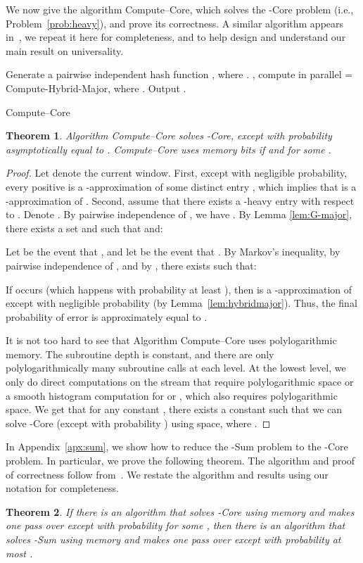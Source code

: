 \documentclass[11pt]{article}
\newtheorem{thm}{Theorem}
\begin{document}
We now give the algorithm Compute--Core, which solves the -Core problem
(i.e., Problem~\ref{prob:heavy}), and prove its correctness.
A similar algorithm appears in~\cite{BO10}, we
repeat it here for completeness, and to help design and understand our main result on universality.

\begin{algorithm}\label{alg:heavy}
\DontPrintSemicolon
Generate a pairwise independent hash function , where . \;
, compute in parallel  = Compute-Hybrid-Major,
where . \;
Output . \;
\caption{Compute--Core}
\end{algorithm}

\begin{thm}\label{thm:gcore}
Algorithm Compute--Core solves -Core, except with probability asymptotically equal to .
Compute--Core uses  memory bits if  and 
for some .
\end{thm}

\begin{proof}
Let  denote the current window.  First, except with negligible probability, every positive  is a
-approximation of some distinct entry , which implies that
 is a -approximation of .  Second, assume that there exists a -heavy
entry  with respect to . Denote . By pairwise independence of , we have
.  By Lemma \ref{lem:G-major}, there exists a set  and  such that
 and:

Let  be the event that , and let  be the event that .
By Markov's inequality, by pairwise independence of , and by , there exists  such that:

If  occurs (which happens with probability at least ), then  is a -approximation of 
except with negligible probability (by Lemma~\ref{lem:hybridmajor}).  Thus, the final probability of error is approximately equal to .

It is not too hard to see that Algorithm Compute--Core uses polylogarithmic memory.  The subroutine depth is constant, and there are only
polylogarithmically many subroutine calls at each level.  At the lowest level, we only do direct computations on the stream that require polylogarithmic
space or a smooth histogram computation for  or , which also requires polylogarithmic space.
We get that for any constant , there exists a constant  such that we can solve -Core (except with probability ) using
 space, where .
\end{proof}

In Appendix~\ref{apx:sum}, we show how to reduce the -Sum problem to the -Core problem.  In
particular, we prove the following theorem.  The algorithm and proof of correctness follow from~\cite{BO13}.
We restate the algorithm and results using our notation for completeness.
\begin{thm}\label{thm:gsum from gcore}
If there is an algorithm that solves -Core using memory  and makes one pass over
 except with probability  for some , then there is an algorithm that
solves -Sum using memory  and makes one pass over  except with probability at most .
\end{thm}
\end{document}
